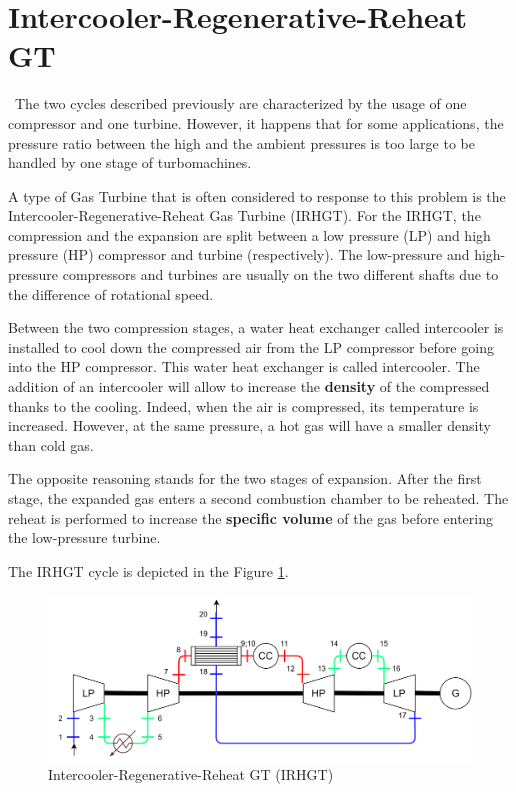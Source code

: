 \section{Intercooler-Regenerative-Reheat GT}
\quad\ The two cycles described previously are characterized by the usage of one compressor and one turbine. However, it happens that for some applications, the pressure ratio between the high and the ambient pressures is too large to be handled by one stage of turbomachines.

A type of Gas Turbine that is often considered to response to this problem is the Intercooler-Regenerative-Reheat Gas Turbine (IRHGT). For the IRHGT, the compression and the expansion are split between a low pressure (LP) and high pressure (HP) compressor and turbine (respectively). The low-pressure and high-pressure compressors and turbines are usually on the two different shafts due to the difference of rotational speed.  

Between the two compression stages, a water heat exchanger called intercooler is installed to cool down the compressed air from the LP compressor before going into the HP compressor. This water heat exchanger is called intercooler. The addition of an intercooler will allow to increase the \textbf{density} of the compressed thanks to the cooling. Indeed, when the air is compressed, its temperature is increased. However, at the same pressure, a hot gas will have a smaller density than cold gas. 

The opposite reasoning stands for the two stages of expansion. After the first stage, the expanded gas enters a second combustion chamber to be reheated. The reheat is performed to increase the \textbf{specific volume} of the gas before entering the low-pressure turbine. 

The IRHGT cycle is depicted in the Figure \ref{fig:C5_IRHGT}.

\begin{figure}[h]
\centering
\includegraphics[width=1\textwidth]{IRHGT}
\caption{Intercooler-Regenerative-Reheat GT (IRHGT)}
\label{fig:C5_IRHGT}
\end{figure}

